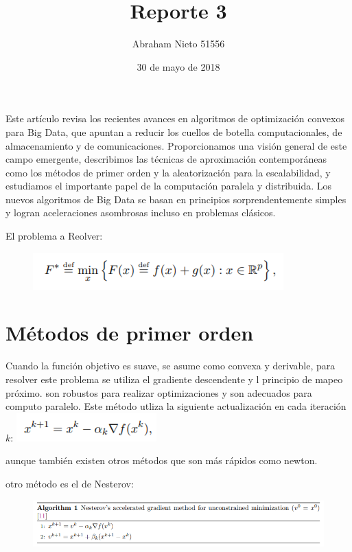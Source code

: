 \documentclass[]{article}
\title{Reporte 3}
\author{Abraham Nieto 51556}
\date{30 de mayo de 2018}
\begin{document}
\maketitle

Este artículo revisa los recientes avances en algoritmos de optimización
convexos para Big Data, que apuntan a reducir los cuellos de botella
computacionales, de almacenamiento y de comunicaciones. Proporcionamos
una visión general de este campo emergente, describimos las técnicas de
aproximación contemporáneas como los métodos de primer orden y la
aleatorización para la escalabilidad, y estudiamos el importante papel
de la computación paralela y distribuida. Los nuevos algoritmos de Big
Data se basan en principios sorprendentemente simples y logran
aceleraciones asombrosas incluso en problemas clásicos.

El problema a Reolver:

\begin{figure}
\centering
\includegraphics{min.png}
\caption{}
\end{figure}

\section{Métodos de primer orden}\label{metodos-de-primer-orden}

Cuando la función objetivo es suave, se asume como convexa y derivable,
para resolver este problema se utiliza el gradiente descendente y l
principio de mapeo próximo. son robustos para realizar optimizaciones y
son adecuados para computo paralelo. Este método utliza la siguiente
actualización en cada iteración \(k\): \includegraphics{soft.png}

aunque también existen otros métodos que son más rápidos como newton.

otro método es el de Nesterov:

\begin{figure}
\centering
\includegraphics{nesterov.png}
\caption{}
\end{figure}
\end{document}
